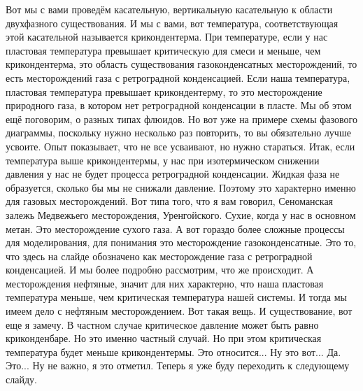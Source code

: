 \documentclass[main.tex]{subfiles}
\begin{document}
Вот мы с вами проведём касательную, вертикальную касательную к области двухфазного существования.
И мы с вами, вот температура, соответствующая этой касательной называется крикондентерма.
При температуре, если у нас пластовая температура превышает критическую для смеси и меньше, чем крикондентерма, это область существования газоконденсатных месторождений, то есть месторождений газа с ретроградной конденсацией.
Если наша температура, пластовая температура превышает крикондентерму, то это месторождение природного газа, в котором нет ретроградной конденсации в пласте.
Мы об этом ещё поговорим, о разных типах флюидов.
Но вот уже на примере схемы фазового диаграммы, поскольку нужно несколько раз повторить, то вы обязательно лучше усвоите.
Опыт показывает, что не все усваивают, но нужно стараться.
Итак, если температура выше крикондентермы, у нас при изотермическом снижении давления у нас не будет процесса ретроградной конденсации.
Жидкая фаза не образуется, сколько бы мы не снижали
давление.
Поэтому это характерно именно для газовых месторождений.
Вот типа того, что я вам говорил, Сеноманская залежь Медвежьего месторождения, Уренгойского.
Сухие, когда у нас в основном метан.
Это месторождение сухого газа.
А вот гораздо более сложные процессы для моделирования, для понимания это месторождение газоконденсатные.
Это то, что здесь на слайде обозначено как месторождение газа с ретроградной конденсацией.
И мы более подробно рассмотрим, что же происходит.
А месторождения нефтяные, значит для них характерно, что наша пластовая температура меньше, чем критическая температура нашей системы.
И тогда мы имеем дело с нефтяным месторождением.
Вот такая вещь.
И существование, вот еще я замечу.
В частном случае критическое давление может быть равно криконденбаре.
Но это именно частный случай.
Но при этом критическая температура будет меньше крикондентермы.
Это относится...
Ну это вот...
Да.
Это...
Ну не важно, я это отметил.
Теперь я уже буду переходить к следующему слайду.
\end{document}
